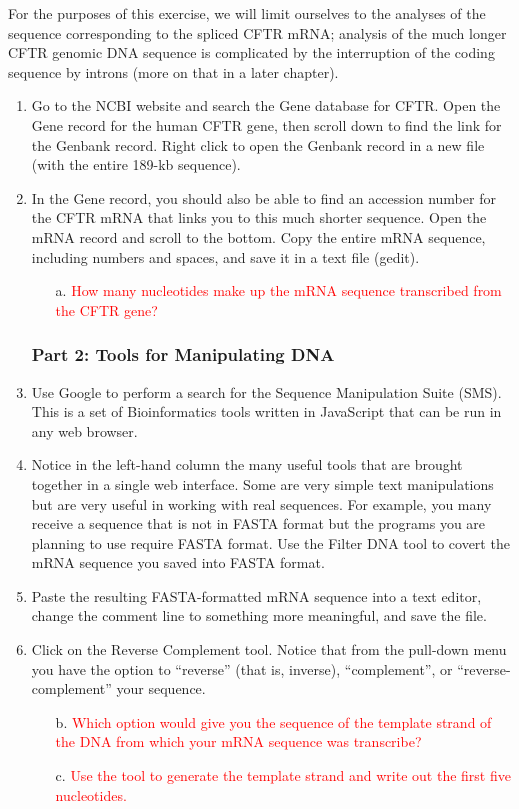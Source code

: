 \noindent For the purposes of this exercise, we will limit ourselves to the analyses of the sequence corresponding to the spliced CFTR mRNA; analysis of the much longer CFTR genomic DNA sequence is complicated by the interruption of the coding sequence by introns (more on that in a later chapter).  

\begin{enumerate}
	\item  Go to the NCBI website and search the Gene database for CFTR.  Open the Gene record for the human CFTR gene, then scroll down to find the link for the Genbank record.  Right click to open the Genbank record in a new file (with the entire 189-kb sequence).  
	\item  In the Gene record, you should also be able to find an accession number for the CFTR mRNA that links you to this much shorter sequence.  Open the mRNA record and scroll to the bottom.  Copy the entire mRNA sequence, including numbers and spaces, and save it in a text file (gedit).
	\begin{itemize}
		\item[a.] \textcolor{red}{How many nucleotides make up the mRNA sequence transcribed from the CFTR gene?}
	\end{itemize}		
	
	\subsubsection*{Part 2: Tools for Manipulating DNA}
	\item Use Google to perform a search for the Sequence Manipulation Suite (SMS).  This is a set of Bioinformatics tools written in JavaScript that can be run in any web browser.  
	\item  Notice in the left-hand column the many useful tools that are brought together in a single web interface.  Some are very simple text manipulations but are very useful in working with real sequences.  For example, you many receive a sequence that is not in FASTA format but the programs you are planning to use require FASTA format.  Use the Filter DNA tool to covert the mRNA sequence you saved into FASTA format.
	\item  Paste the resulting FASTA-formatted mRNA sequence into a text editor, change the comment line to something more meaningful, and save the file.
	\item  Click on the Reverse Complement tool.  Notice that from the pull-down menu you have the option to ``reverse'' (that is, inverse), ``complement'', or ``reverse-complement'' your sequence. 
	\begin{itemize}
		\item[b.] \textcolor{red}{Which option would give you the sequence of the template strand of the DNA from which your mRNA sequence was transcribe? } 
		\item[c.] \textcolor{red}{Use the tool to generate the template strand and write out the first five nucleotides.}
	\end{itemize}
	

\end{enumerate}
